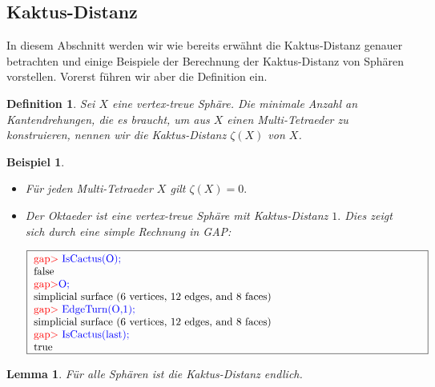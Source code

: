 \documentclass[12pt,titlepage,twoside,cleardoublepage]{article}
\theoremstyle{nummermitklammern}
\newtheorem{lemma}[temp]{Lemma}
\newtheorem{bsp}[temp]{Beispiel}
\newtheorem{definition}[temp]{Definition}
\newtheorem{definition}[zahl]{Definition}
\newtheorem{lemma}[zahl]{Lemma}
\newtheorem{bsp}[zahl]{Beispiel}
\numberwithin{equation}{section}
\begin{document}
\subsection{Kaktus-Distanz}
In diesem Abschnitt werden wir wie bereits erwähnt die Kaktus-Distanz genauer betrachten und einige Beispiele der Berechnung der Kaktus-Distanz von Sphären vorstellen.
Vorerst führen wir aber die Definition ein.
\begin{definition}
Sei $X$ eine vertex-treue Sphäre. Die minimale Anzahl an Kantendrehungen, die es braucht, um aus $X$ einen Multi-Tetraeder zu  konstruieren, nennen wir die \emph{Kaktus-Distanz} $\zeta(X)$ von $X$.
\end{definition}
\begin{bsp}
\begin{itemize}
\item Für jeden Multi-Tetraeder $X$ gilt $\zeta(X)=0.$
\item Der Oktaeder ist eine vertex-treue Sphäre mit Kaktus-Distanz $1.$ Dies zeigt sich durch eine simple Rechnung in GAP:
\begin{center}
$\fbox{
\parbox{13cm}{
\textcolor{red}{gap$>$} \textcolor{blue}{IsCactus(O);}\\
false\\
\textcolor{red}{gap$>$}\textcolor{blue}{ O;}\\
simplicial surface (6 vertices, 12 edges, and 8 faces)\\
\textcolor{red}{gap$>$} \textcolor{blue}{EdgeTurn(O,1);}\\
simplicial surface (6 vertices, 12 edges, and 8 faces)\\
\textcolor{red}{gap$>$} \textcolor{blue}{IsCactus(last);}\\
true
}}$
\end{center}
\end{itemize}
\end{bsp}
\begin{lemma}
Für alle Sphären ist die Kaktus-Distanz endlich.
\end{lemma}
\end{document}
